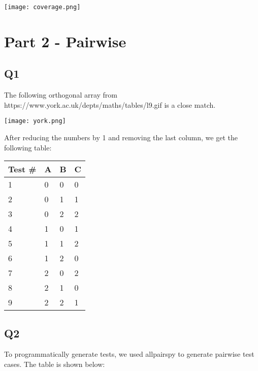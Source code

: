 \documentclass[12pt, letterpaper, titlepage]{article}
\begin{document}
\texttt{[image: coverage.png]}

\section{Part 2 - Pairwise}
\subsection*{Q1}
The following orthogonal array from https://www.york.ac.uk/depts/maths/tables/l9.gif is a close match.

\begin{centering}
\texttt{[image: york.png]}
\end{centering}

After reducing the numbers by 1 and removing the last column, we get the following table:

\begin{centering}
    \begin{tabularx}{\textwidth}{|X|X|X|X|}
        \caption{Test cases similar orthogonal array.} \\ \hline
        Test \# & A & B & C \\ \hline
        1 & 0 & 0 & 0 \\ \hline
        2 & 0 & 1 & 1 \\ \hline
        3 & 0 & 2 & 2 \\ \hline
        4 & 1 & 0 & 1 \\ \hline
        5 & 1 & 1 & 2 \\ \hline
        6 & 1 & 2 & 0 \\ \hline
        7 & 2 & 0 & 2 \\ \hline
        8 & 2 & 1 & 0 \\ \hline
        9 & 2 & 2 & 1 \\ \hline
    \end{tabularx}
\end{centering}

\subsection*{Q2}
To programmatically generate tests, we used allpairspy to generate pairwise test cases. The table is shown below:
\end{document}
